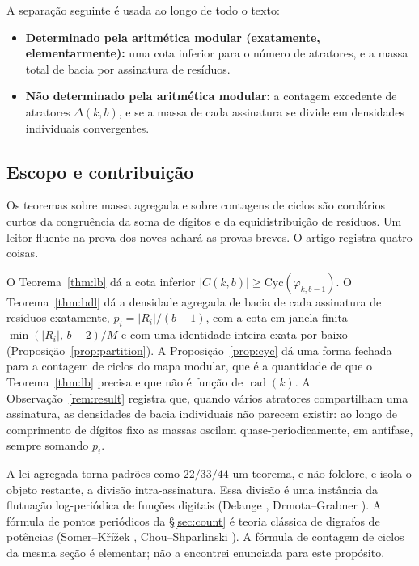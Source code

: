 \documentclass[11pt]{article}
\theoremstyle{definition}
\theoremstyle{remark}
\newcommand{\Cyc}{\mathrm{Cyc}}
\DeclareMathOperator{\rad}{rad}
\begin{document}
A separação seguinte é usada ao longo de todo o texto:
\begin{itemize}
\item \textbf{Determinado pela aritmética modular (exatamente, elementarmente):} uma cota inferior para o número de atratores, e a massa total de bacia por assinatura de resíduos.
\item \textbf{Não determinado pela aritmética modular:} a contagem excedente de atratores $\Delta(k,b)$, e se a massa de cada assinatura se divide em densidades individuais convergentes.
\end{itemize}

\subsection{Escopo e contribuição}

Os teoremas sobre massa agregada e sobre contagens de ciclos são corolários curtos da congruência da soma de dígitos e da equidistribuição de resíduos. Um leitor fluente na prova dos noves achará as provas breves. O artigo registra quatro coisas.

O Teorema~\ref{thm:lb} dá a cota inferior $|C(k,b)| \ge \Cyc(\varphi_{k,b-1})$. O Teorema~\ref{thm:bdl} dá a densidade agregada de bacia de cada assinatura de resíduos exatamente, $p_i = |R_i|/(b-1)$, com a cota em janela finita $\min(|R_i|,\,b-2)/M$ e com uma identidade inteira exata por baixo (Proposição~\ref{prop:partition}). A Proposição~\ref{prop:cyc} dá uma forma fechada para a contagem de ciclos do mapa modular, que é a quantidade de que o Teorema~\ref{thm:lb} precisa e que não é função de $\rad(k)$. A Observação~\ref{rem:result} registra que, quando vários atratores compartilham uma assinatura, as densidades de bacia individuais não parecem existir: ao longo de comprimento de dígitos fixo as massas oscilam quase-periodicamente, em antifase, sempre somando $p_i$.

A lei agregada torna padrões como $22/33/44$ um teorema, e não folclore, e isola o objeto restante, a divisão intra-assinatura. Essa divisão é uma instância da flutuação log-periódica de funções digitais (Delange \cite{delange}, Drmota--Grabner \cite{drmota-grabner}). A fórmula de pontos periódicos da \S\ref{sec:count} é teoria clássica de digrafos de potências (Somer--K\v{r}\'i\v{z}ek \cite{somer-krizek}, Chou--Shparlinski \cite{chou-shparlinski}). A fórmula de contagem de ciclos da mesma seção é elementar; não a encontrei enunciada para este propósito.
\end{document}
